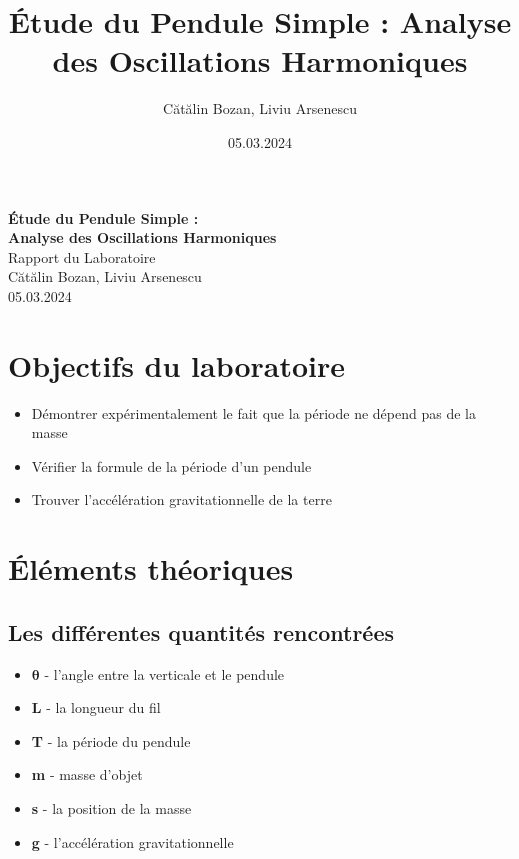 \documentclass[12pt,a4paper]{article}
\title{Étude du Pendule Simple : Analyse des Oscillations Harmoniques}
\author{Cătălin Bozan, Liviu Arsenescu}
\date{05.03.2024}
\begin{document}
    \begin{titlepage}
        \begin{center}
            \vspace*{\fill}
            \Huge \textbf{Étude du Pendule Simple :} \\
            \Huge \textbf{Analyse des Oscillations Harmoniques} \\
            \Large Rapport du Laboratoire \\
            \vspace{\fill}
            \Large Cătălin Bozan, Liviu Arsenescu \\
            05.03.2024

            \vspace*{\fill}
        \end{center}
    \end{titlepage}
    \newpage

    \section{Objectifs du laboratoire}
    \begin{itemize}
        \item Démontrer expérimentalement le fait que la période ne dépend pas de la masse
        \item Vérifier la formule de la période d'un pendule
        \item Trouver l'accélération gravitationnelle de la terre
    \end{itemize}

    \section{Éléments théoriques}
    \subsection{Les différentes quantités rencontrées}
    \begin{itemize}
        \item $\bm{\theta}$ - l'angle entre la verticale et le pendule
        \item \textbf{L} - la longueur du fil
        \item \textbf{T} - la période du pendule
        \item \textbf{m} - masse d'objet
        \item \textbf{s} - la position de la masse
        \item \textbf{g} - l'accélération gravitationnelle
    \end{itemize}
\end{document}
